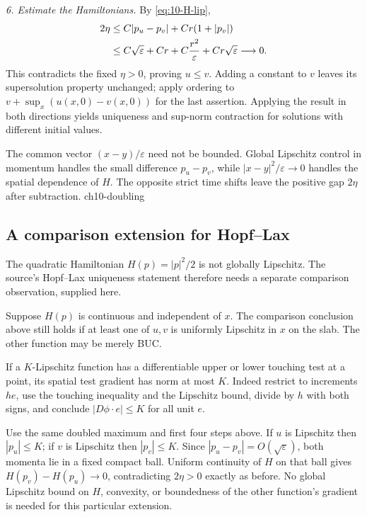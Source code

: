 \begin{expandedproof}
\textit{6. Estimate the Hamiltonians.}
By \eqref{eq:10-H-lip},
\[
 \begin{split}
 2\eta&\leq C|p_u-p_v|+Cr(1+|p_v|)\\
 &\leq C\sqrt\varepsilon+Cr
        +C{r^2\over\varepsilon}+Cr\sqrt\varepsilon\longrightarrow0.
 \end{split}
\]
This contradicts the fixed $\eta>0$, proving $u\leq v$.
Adding a constant to $v$ leaves its supersolution property unchanged;
apply ordering to $v+\sup_x(u(x,0)-v(x,0))$ for the last assertion.
Applying the result in both directions yields uniqueness and sup-norm
contraction for solutions with different initial values.
\end{expandedproof}
{The common vector $(x-y)/\varepsilon$ need not be bounded. Global Lipschitz control in momentum handles the small difference $p_u-p_v$, while $|x-y|^2/\varepsilon\to0$ handles the spatial dependence of $H$. The opposite strict time shifts leave the positive gap $2\eta$ after subtraction.}
{ch10-doubling}
\Needspace{42mm}

\Needspace{70mm}
\subsection{A comparison extension for Hopf--Lax}
The quadratic Hamiltonian $H(p)=|p|^2/2$ is not globally Lipschitz.
The source's Hopf--Lax uniqueness statement therefore needs a separate
comparison observation, supplied here.
\Needspace{55mm}
\begin{theorem}
Suppose $H(p)$ is continuous and independent of $x$. The comparison
conclusion above still holds if at least one of $u,v$ is uniformly
Lipschitz in $x$ on the slab. The other function may be merely BUC.
\end{theorem}
\begin{expandedproof}
If a $K$-Lipschitz function has a differentiable upper or lower touching
test at a point, its spatial test gradient has norm at most $K$.
Indeed restrict to increments $he$, use the touching inequality and the
Lipschitz bound, divide by $h$ with both signs, and conclude
$|D\phi\cdot e|\leq K$ for all unit $e$.

Use the same doubled maximum and first four steps above. If $u$ is
Lipschitz then $|p_u|\leq K$; if $v$ is Lipschitz then $|p_v|\leq K$.
Since $|p_u-p_v|=O(\sqrt\varepsilon)$, both momenta lie in a fixed
compact ball. Uniform continuity of $H$ on that ball gives
$H(p_v)-H(p_u)\to0$, contradicting $2\eta>0$ exactly as before.
No global Lipschitz bound on $H$, convexity, or boundedness of the
other function's gradient is needed for this particular extension.
\end{expandedproof}
\Needspace{42mm}

